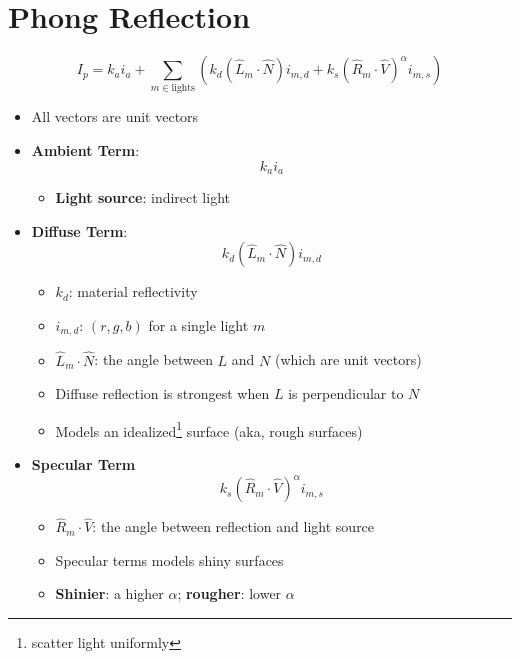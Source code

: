 \section{Phong Reflection}

\begin{equation}
  I_{p} = k_{a} i_{a} +
  \sum_{m \in \text{lights}}
  \left(
    k_{d} \left( \hat{L}_{m} \cdot \hat{N} \right) i_{m, d} +
    k_{s} \left( \hat{R}_{m} \cdot \hat{V} \right)^{\alpha} i_{m, s}
  \right)
\end{equation}

\begin{itemize}
  \item All vectors are unit vectors
  \item \textbf{Ambient Term}:
  \begin{equation}
    k_{a} i_{a}
  \end{equation}
  \begin{itemize}
    \item \textbf{Light source}: indirect light
  \end{itemize}

  \item \textbf{Diffuse Term}:
  \begin{equation}
    k_{d} \left( \hat{L}_{m} \cdot \hat{N} \right) i_{m, d}
  \end{equation}
  \begin{itemize}
    \item $ k_{d} $: material reflectivity
    \item $ i_{m, d} $: $ \left( r, g, b \right) $ for a single light $ m $
    \item $ \hat{L}_{m} \cdot \hat{N} $: the angle between $ L $ and $ N $
    (which are unit vectors)
    \item Diffuse reflection is strongest when $ L $ is
    perpendicular to $ N $
    \item Models an idealized\footnote{scatter light uniformly} surface
    (aka, rough surfaces)
  \end{itemize}

  \item \textbf{Specular Term}
  \begin{equation}
    k_{s} \left( \hat{R}_{m} \cdot \hat{V} \right)^{\alpha} i_{m, s}
  \end{equation}
  \begin{itemize}
    \item $ \hat{R}_{m} \cdot \hat{V} $: the angle between reflection and
    light source
    \item Specular terms models shiny surfaces
    \item \textbf{Shinier}: a higher $ \alpha $; \textbf{rougher}:
    lower $ \alpha $
  \end{itemize}
\end{itemize}

